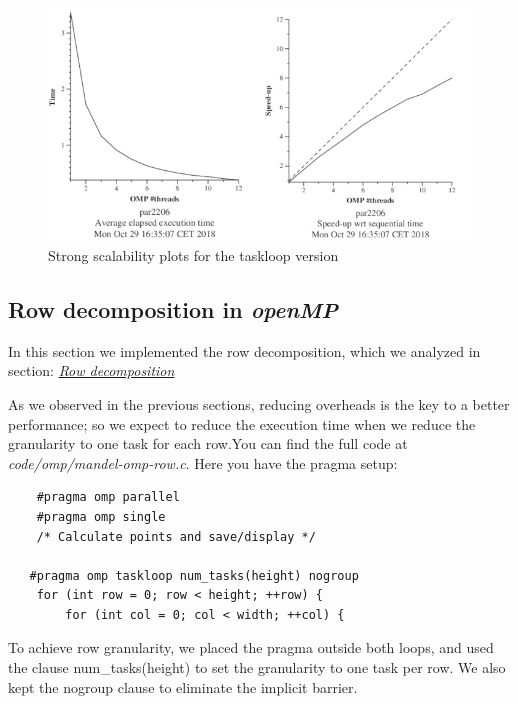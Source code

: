 \documentclass{article}
\begin{document}
\begin{figure}[h]
    \centering
    \includegraphics[width=1\textwidth]{strongPoint3.png}
    \caption{Strong scalability plots for the taskloop version}
    \label{fig:strongpoint3}
\end{figure}
\subsection{Row decomposition in \textit{openMP}}
\justify
In this section we implemented the row decomposition, which we analyzed in section: \hyperref[sec:rowAnalysis]{\textit{Row decomposition}}

\justify
As we observed in the previous sections, reducing overheads is the key to a better performance; so we expect to reduce the execution time when we reduce the granularity to one task for each row.\newline You can find the full code at \textit{code/omp/mandel-omp-row.c}. Here you have the pragma setup:

\begin{lstlisting}
    #pragma omp parallel
    #pragma omp single
    /* Calculate points and save/display */

   #pragma omp taskloop num_tasks(height) nogroup 
    for (int row = 0; row < height; ++row) {
        for (int col = 0; col < width; ++col) {
\end{lstlisting}
\justify
To achieve row granularity, we placed the pragma outside both loops, and used the clause num\_tasks(height) to set the granularity to one task per row. We also kept the nogroup clause to eliminate the implicit barrier.  
\end{document}
